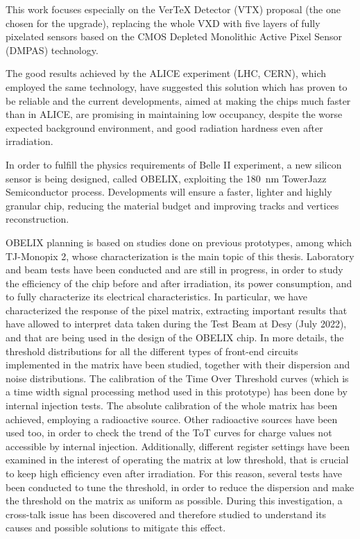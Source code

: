 This work focuses especially on the VerTeX Detector (VTX) proposal (the one chosen for the upgrade), replacing the whole VXD with five layers of fully pixelated sensors based on the CMOS Depleted Monolithic Active Pixel Sensor (DMPAS) technology.

The good results achieved by the ALICE experiment (LHC, CERN), which employed the same technology, have suggested this solution which has proven to be reliable and the current developments, aimed at making the chips much faster than in ALICE, are promising in maintaining low occupancy, despite the worse expected background environment, and good radiation hardness even after irradiation. 

In order to fulfill the physics requirements of Belle II experiment, a new silicon sensor is being designed, called OBELIX, exploiting the \SI{180}{nm} TowerJazz Semiconductor process. Developments will ensure a faster, lighter and highly granular chip, reducing the material budget and improving tracks and vertices reconstruction. 

OBELIX planning is based on studies done on previous prototypes, among which TJ-Monopix 2, whose characterization is the main topic of this thesis. Laboratory and beam tests have been conducted and are still in progress, in order to study the efficiency of the chip before and after irradiation, its power consumption, and to fully characterize its electrical characteristics. 
In particular, we have characterized the response of the pixel matrix, extracting important results that have allowed to interpret data taken during the Test Beam at Desy (July 2022), and that are being used in the design of the OBELIX chip. 
In more details, the threshold distributions for all the different types of front-end circuits implemented in the matrix have been studied, together with their dispersion and noise distributions. 
The calibration of the Time Over Threshold curves (which is a time width signal processing method used in this prototype) has been done by internal injection tests. The absolute calibration of the whole matrix has been achieved, employing a  radioactive source. Other radioactive sources have been used too, in order to check the trend of the ToT curves for charge values not accessible by internal injection. 
Additionally, different register settings have been examined in the interest of operating the matrix at low threshold, that is crucial to keep high efficiency even after irradiation. For this reason, several tests have been conducted to tune the threshold, in order to reduce the dispersion and make the threshold on the matrix as uniform as possible.
During this investigation, a cross-talk issue has been discovered and therefore studied to understand its causes and possible solutions to mitigate this effect.



